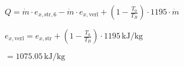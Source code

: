 \( Q = \dot{m} \cdot e_{x,\text{str},6} - \dot{m} \cdot e_{x,\text{verl}} + \left( 1 - \frac{T_0}{T_B} \right) \cdot 1195 \cdot \dot{m} \)  

\( e_{x,\text{verl}} = e_{x,\text{str}} + \left( 1 - \frac{T_0}{T_B} \right) \cdot 1195 \, \text{kJ/kg} \)  

\( = 1075.05 \, \text{kJ/kg} \)